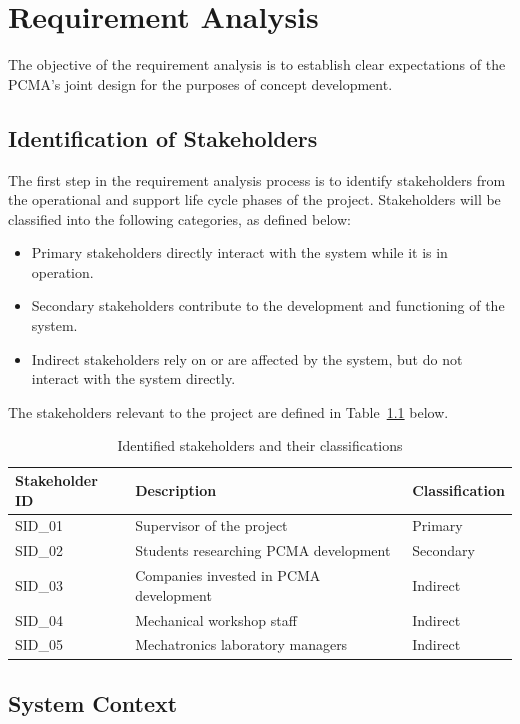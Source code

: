 \chapter{Requirement Analysis}

The objective of the requirement analysis is to establish clear expectations of the PCMA's joint design for the purposes of concept development.

\section{Identification of Stakeholders}

The first step in the requirement analysis process is to identify stakeholders from the operational and support life cycle phases of the project. Stakeholders will be classified into the following categories, as defined below:
\begin{itemize}
	\item Primary stakeholders directly interact with the system while it is in operation.
	\item Secondary stakeholders contribute to the development and functioning of the system.
	\item Indirect stakeholders rely on or are affected by the system, but do not interact with the system directly.
\end{itemize}
The stakeholders relevant to the project are defined in Table~\ref{tab:SID table} below.
\begin{table}[htbp]
	\centering
	\caption{Identified stakeholders and their classifications}
	\label{tab:SID table}
	\begin{tabular}{|l|l|l|}
		\hline
		\textbf{Stakeholder ID} & \textbf{Description} & \textbf{Classification} \\ \hline
		SID\_01 & Supervisor of the project & Primary \\ \hline
		SID\_02 & Students researching PCMA development & Secondary \\ \hline
		SID\_03 & Companies invested in PCMA development & Indirect\\ \hline
		SID\_04 & Mechanical workshop staff & Indirect \\ \hline
		SID\_05 & Mechatronics laboratory managers & Indirect \\ \hline
	\end{tabular}
\end{table}

\section{System Context}

